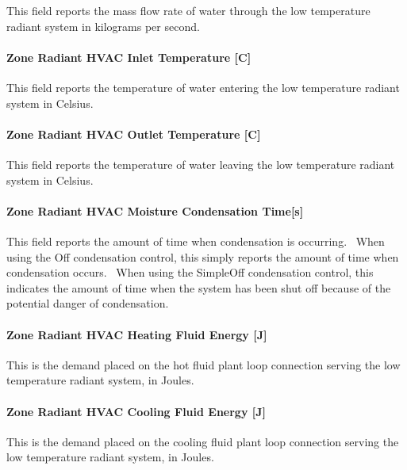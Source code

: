 This field reports the mass flow rate of water through the low temperature radiant system in kilograms per second.

\paragraph{Zone Radiant HVAC Inlet Temperature {[}C{]}}\label{zone-radiant-hvac-inlet-temperature-c}

This field reports the temperature of water entering the low temperature radiant system in Celsius.

\paragraph{Zone Radiant HVAC Outlet Temperature {[}C{]}}\label{zone-radiant-hvac-outlet-temperature-c}

This field reports the temperature of water leaving the low temperature radiant system in Celsius.

\paragraph{Zone Radiant HVAC Moisture Condensation Time{[}s{]}}\label{zone-radiant-hvac-moisture-condensation-times}

This field reports the amount of time when condensation is occurring.~ When using the Off condensation control, this simply reports the amount of time when condensation occurs.~ When using the SimpleOff condensation control, this indicates the amount of time when the system has been shut off because of the potential danger of condensation.

\paragraph{Zone Radiant HVAC Heating Fluid Energy {[}J{]}}\label{zone-radiant-hvac-heating-fluid-energy-j}

This is the demand placed on the hot fluid plant loop connection serving the low temperature radiant system, in Joules.

\paragraph{Zone Radiant HVAC Cooling Fluid Energy {[}J{]}}\label{zone-radiant-hvac-cooling-fluid-energy-j}

This is the demand placed on the cooling fluid plant loop connection serving the low temperature radiant system, in Joules.

